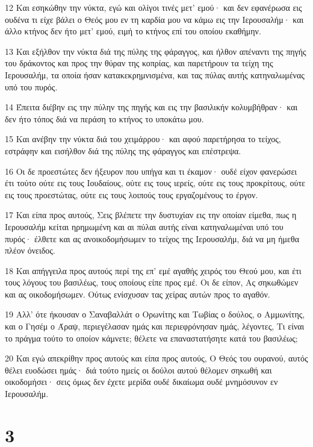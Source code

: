 \par 12 Και εσηκώθην την νύκτα, εγώ και ολίγοι τινές μετ' εμού· και δεν εφανέρωσα εις ουδένα τι είχε βάλει ο Θεός μου εν τη καρδία μου να κάμω εις την Ιερουσαλήμ· και άλλο κτήνος δεν ήτο μετ' εμού, ειμή το κτήνος επί του οποίου εκαθήμην.
\par 13 Και εξήλθον την νύκτα διά της πύλης της φάραγγος, και ήλθον απέναντι της πηγής του δράκοντος και προς την θύραν της κοπρίας, και παρετήρουν τα τείχη της Ιερουσαλήμ, τα οποία ήσαν κατακεκρημνισμένα, και τας πύλας αυτής κατηναλωμένας υπό του πυρός.
\par 14 Έπειτα διέβην εις την πύλην της πηγής και εις την βασιλικήν κολυμβήθραν· και δεν ήτο τόπος διά να περάση το κτήνος το υποκάτω μου.
\par 15 Και ανέβην την νύκτα διά του χειμάρρου· και αφού παρετήρησα το τείχος, εστράφην και εισήλθον διά της πύλης της φάραγγος και επέστρεψα.
\par 16 Οι δε προεστώτες δεν ήξευρον που υπήγα και τι έκαμον· ουδέ είχον φανερώσει έτι τούτο ούτε εις τους Ιουδαίους, ούτε εις τους ιερείς, ούτε εις τους προκρίτους, ούτε εις τους προεστώτας, ούτε εις τους λοιπούς τους εργαζομένους το έργον.
\par 17 Και είπα προς αυτούς, Σεις βλέπετε την δυστυχίαν εις την οποίαν είμεθα, πως η Ιερουσαλήμ κείται ηρημωμένη και αι πύλαι αυτής είναι κατηναλωμέναι υπό του πυρός· έλθετε και ας ανοικοδομήσωμεν το τείχος της Ιερουσαλήμ, διά να μη ήμεθα πλέον όνειδος.
\par 18 Και απήγγειλα προς αυτούς περί της επ' εμέ αγαθής χειρός του Θεού μου, και έτι τους λόγους του βασιλέως, τους οποίους είπε προς εμέ. Οι δε είπον, Ας σηκωθώμεν και ας οικοδομήσωμεν. Ούτως ενίσχυσαν τας χείρας αυτών προς το αγαθόν.
\par 19 Αλλ' ότε ήκουσαν ο Σαναβαλλάτ ο Ορωνίτης και Τωβίας ο δούλος, ο Αμμωνίτης, και ο Γησέμ ο Άραψ, περιεγέλασαν ημάς και περιεφρόνησαν ημάς, λέγοντες, Τι είναι το πράγμα τούτο το οποίον κάμνετε; θέλετε να επαναστατήσητε κατά του βασιλέως;
\par 20 Και εγώ απεκρίθην προς αυτούς και είπα προς αυτούς, Ο Θεός του ουρανού, αυτός θέλει ευοδώσει ημάς· διά τούτο ημείς οι δούλοι αυτού θέλομεν σηκωθή και οικοδομήσει· σεις όμως δεν έχετε μερίδα ουδέ δικαίωμα ουδέ μνημόσυνον εν Ιερουσαλήμ.

\chapter{3}

